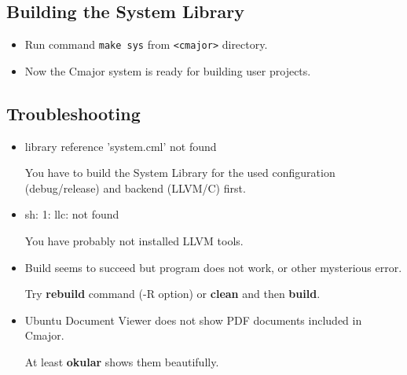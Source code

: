 \documentclass[oneside, a4paper, 11pt]{article}
\begin{document}
\subsection{Building the System Library}

\begin{itemize}

\item
Run command \verb|make sys| from \verb|<cmajor>| directory.

\item
Now the Cmajor system is ready for building user projects.

\end{itemize}

\subsection{Troubleshooting}

\begin{itemize}

\item
library reference 'system.cml' not found

You have to build the System Library for the used configuration (debug/release) and backend (LLVM/C) first.

\item
sh: 1: llc: not found

You have probably not installed LLVM tools.

\item
Build seems to succeed but program does not work, or other mysterious error.

Try \textbf{rebuild} command (-R option) or \textbf{clean} and then \textbf{build}.

\item
Ubuntu Document Viewer does not show PDF documents included in Cmajor.

At least \textbf{okular} shows them beautifully.

\end{itemize}
\end{document}

